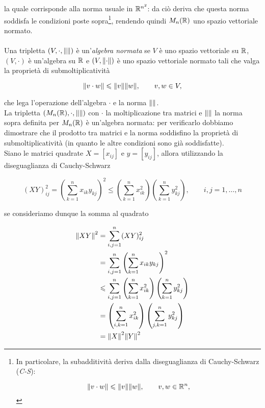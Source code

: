 la quale corrisponde alla norma usuale in $ \mathbb{R}^{n^{2}} $: da ciò deriva che questa norma soddisfa le condizioni poste sopra\footnote{%
	In particolare, la subadditività deriva dalla diseguaglianza di Cauchy-Schwarz (\textit{C-S}):
	
	\begin{equation}
		\norm{v \cdot w} \leqslant \norm{v} \norm{w}, \qquad v,w \in \mathbb{R}^{n},
	\end{equation}%
}, rendendo quindi $ M_{n}(\mathbb{R}) $ uno spazio vettoriale normato.\\\\
%
Una tripletta $ (V,\cdot,\norm{}) $ è un'\textit{algebra normata} se $ V $ è uno spazio vettoriale su $ \mathbb{R} $, $ (V,\cdot) $ è un'algebra su $ \mathbb{R} $ e $ (V,\norm{\cdot}) $ è uno spazio vettoriale normato tali che valga la proprietà di submoltiplicatività

\begin{equation}
	\norm{v \cdot w} \leqslant \norm{v} \norm{w}, \qquad v,w \in V,
\end{equation}

che lega l'operazione dell'algebra $ \cdot $ e la norma $ \norm{} $.\\
La tripletta $ (M_{n}(\mathbb{R}),\cdot,\norm{}) $ con $ \cdot $ la moltiplicazione tra matrici e $ \norm{} $ la norma sopra definita per $ M_{n}(\mathbb{R}) $ è un'algebra normata: per verificarlo dobbiamo dimostrare che il prodotto tra matrici e la norma soddisfino la proprietà di submoltiplicatività (in quanto le altre condizioni sono già soddisfatte).\\
Siano le matrici quadrate $ X = [x_{ij}] $ e $ y = [y_{ij}] $, allora utilizzando la diseguaglianza di Cauchy-Schwarz

\begin{equation}
	(X Y)_{ij}^{2} = \left( \sum_{k=1}^{n} x_{ik} y_{kj} \right)^{2} \leqslant \left( \sum_{k=1}^{n} x_{ik}^{2} \right) \left( \sum_{k=1}^{n} y_{kj}^{2} \right), \qquad i,j=1,\dots,n
\end{equation}

se consideriamo dunque la somma al quadrato

\begin{align}
	\begin{split}
		\norm{X Y}^{2} &= \sum_{i,j=1}^{n} (X Y)_{ij}^{2}\\
		&= \sum_{i,j=1}^{n} \left( \sum_{k=1}^{n} x_{ik} y_{kj} \right)^{2}\\
		&\leqslant \sum_{i,j=1}^{n} \left( \sum_{k=1}^{n} x_{ik}^{2} \right) \left( \sum_{k=1}^{n} y_{kj}^{2} \right)\\
		&= \left( \sum_{i,k=1}^{n} x_{ik}^{2} \right) \left( \sum_{j,k=1}^{n} y_{kj}^{2} \right)\\
		&= \norm{X}^{2} \norm{Y}^{2}
	\end{split}
\end{align}


